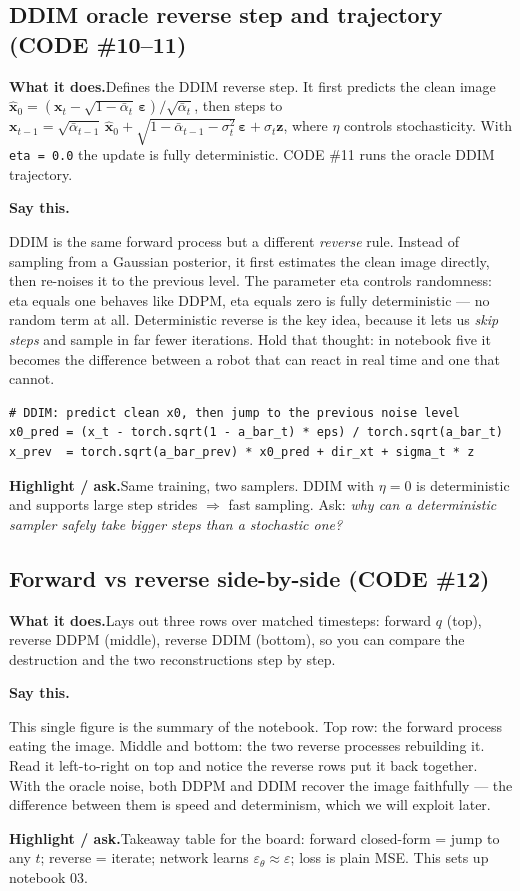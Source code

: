 \documentclass[11pt]{article}
\newenvironment{saythis}{%
  \par\smallskip\noindent
  \begin{list}{}{%
    \setlength{\leftmargin}{1.2em}%
    \setlength{\rightmargin}{0.5em}%
    \setlength{\topsep}{2pt}%
  }\item\relax
  \color{sayrule}\textbf{Say this.}\hspace{0.4em}\color{black}\itshape
}{%
  \end{list}\par\smallskip
}
\newcommand{\highlight}[1]{\par\smallskip\noindent\textcolor{hlcolor}{\textbf{Highlight / ask.}}\hspace{0.4em}#1\par\smallskip}
\newcommand{\whatdoes}[1]{\par\noindent\textbf{What it does.}\hspace{0.4em}#1\par}
\begin{document}
\subsection{DDIM oracle reverse step and trajectory (CODE \#10--11)}
\whatdoes{Defines the DDIM reverse step. It first predicts the clean image
$\hat{\mathbf{x}}_0 = (\mathbf{x}_t - \sqrt{1-\bar\alpha_t}\,\boldsymbol\varepsilon)/\sqrt{\bar\alpha_t}$,
then steps to $\mathbf{x}_{t-1} = \sqrt{\bar\alpha_{t-1}}\,\hat{\mathbf{x}}_0 + \sqrt{1-\bar\alpha_{t-1}-\sigma_t^2}\,\boldsymbol\varepsilon + \sigma_t \mathbf{z}$,
where $\eta$ controls stochasticity. With \texttt{eta = 0.0} the update is fully deterministic. CODE \#11
runs the oracle DDIM trajectory.}
\begin{saythis}
DDIM is the same forward process but a different \emph{reverse} rule. Instead of sampling from a
Gaussian posterior, it first estimates the clean image directly, then re-noises it to the previous
level. The parameter eta controls randomness: eta equals one behaves like DDPM, eta equals zero is
fully deterministic --- no random term at all. Deterministic reverse is the key idea, because it lets
us \emph{skip steps} and sample in far fewer iterations. Hold that thought: in notebook five it becomes
the difference between a robot that can react in real time and one that cannot.
\end{saythis}
\begin{lstlisting}
# DDIM: predict clean x0, then jump to the previous noise level
x0_pred = (x_t - torch.sqrt(1 - a_bar_t) * eps) / torch.sqrt(a_bar_t)
x_prev  = torch.sqrt(a_bar_prev) * x0_pred + dir_xt + sigma_t * z
\end{lstlisting}
\highlight{Same training, two samplers. DDIM with $\eta=0$ is deterministic and supports large step
strides $\Rightarrow$ fast sampling. Ask: \emph{why can a deterministic sampler safely take bigger
steps than a stochastic one?}}

\subsection{Forward vs reverse side-by-side (CODE \#12)}
\whatdoes{Lays out three rows over matched timesteps: forward $q$ (top), reverse DDPM (middle), reverse
DDIM (bottom), so you can compare the destruction and the two reconstructions step by step.}
\begin{saythis}
This single figure is the summary of the notebook. Top row: the forward process eating the image.
Middle and bottom: the two reverse processes rebuilding it. Read it left-to-right on top and notice the
reverse rows put it back together. With the oracle noise, both DDPM and DDIM recover the image
faithfully --- the difference between them is speed and determinism, which we will exploit later.
\end{saythis}
\highlight{Takeaway table for the board: forward closed-form = jump to any $t$; reverse = iterate;
network learns $\varepsilon_\theta \approx \varepsilon$; loss is plain MSE. This sets up notebook 03.}
\end{document}
